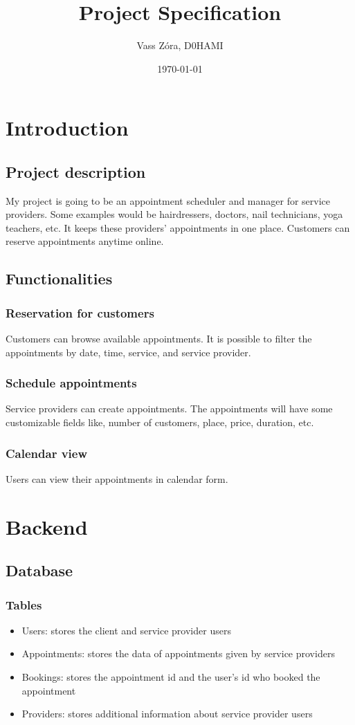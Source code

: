 \documentclass{article}
\title{Project Specification}
\author{Vass Zóra, D0HAMI}
\date{\today}
\begin{document}
    \maketitle
    \section{Introduction}
    \subsection{Project description}
    My project is going to be an appointment scheduler and manager for service providers. Some examples would be hairdressers, doctors, nail technicians, yoga teachers, etc.
    It keeps these providers' appointments in one place. Customers can reserve appointments anytime online. 
    \subsection{Functionalities}
    \subsubsection*{Reservation for customers}
    Customers can browse available appointments. It is possible to filter the appointments by date, time, service, and service provider.
    \subsubsection*{Schedule appointments}
    Service providers can create appointments. The appointments will have some customizable fields like, number of customers, place, price, duration, etc. 
    \subsubsection*{Calendar view}
    Users can view their appointments in calendar form. 
    \section{Backend}
    \subsection{Database}
    \subsubsection*{Tables}
    \begin{itemize}
        \item Users: stores the client and service provider users
        \item Appointments: stores the data of appointments given by service providers
        \item Bookings: stores the appointment id and the user's id who booked the appointment
        \item Providers: stores additional information about service provider users
    \end{itemize}
\end{document}
